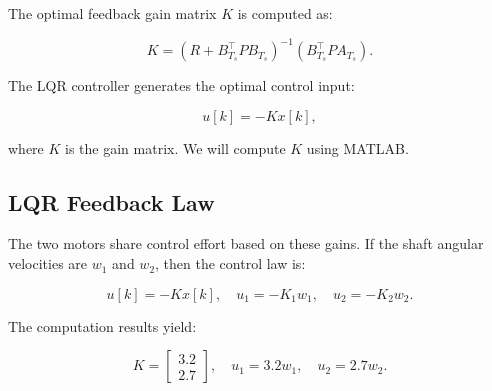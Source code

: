 The optimal feedback gain matrix \( K \) is computed as:

\[
K = \left( R + B_{T_s}^\top P B_{T_s} \right)^{-1} \left(B_{T_s}^\top P A_{T_s} \right).
\]

The LQR controller generates the optimal control input:

\[
u[k] = -K x[k],
\]

where \( K \) is the gain matrix. We will compute \( K \) using MATLAB.

\subsection*{LQR Feedback Law}
The two motors share control effort based on these gains. If the shaft angular velocities are \( w_{1} \) and \( w_{2} \), then the control law is:

\[
u[k] = -K x[k], \quad u_{1} = -K_{1} w_{1}, \quad u_{2} = -K_{2} w_{2}.
\]

The computation results yield:

\[
K = \begin{bmatrix}
3.2 \\ 2.7
\end{bmatrix}, \quad u_{1} = 3.2 w_{1}, \quad u_{2} = 2.7 w_{2}.
\]
